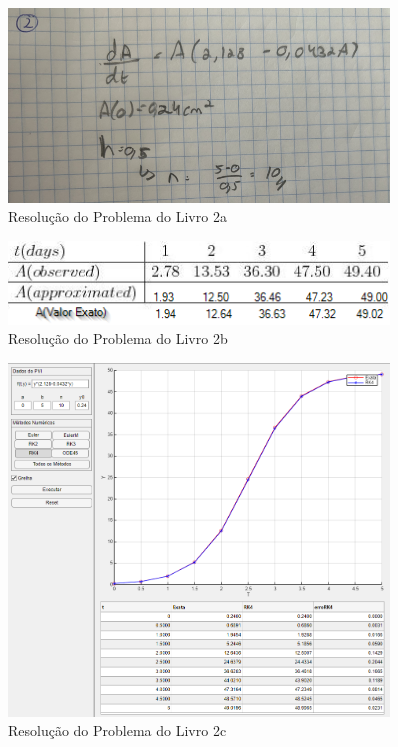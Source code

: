\begin{figure}[H]
    \centering
    \includegraphics[width=0.9\textwidth]{Fotos/2app2a}
    \caption{Resolução do Problema do Livro 2a}
    \label{fig:2app2a}
\end{figure}

\begin{figure}[H]
    \centering
    \includegraphics[width=0.9\textwidth]{Fotos/2app2b}
    \caption{Resolução do Problema do Livro 2b}
    \label{fig:2app2b}
\end{figure}

\begin{figure}[H]
    \centering
    \includegraphics[width=0.9\textwidth]{Fotos/2app2c}
    \caption{Resolução do Problema do Livro 2c}
    \label{fig:2app2c}
\end{figure}

